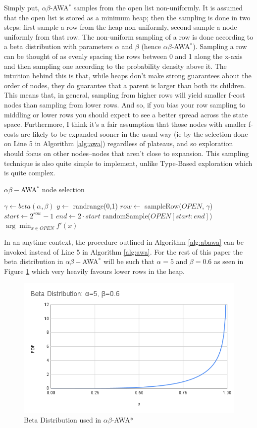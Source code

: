 Simply put, $\alpha \beta$-AWA$^*$ samples from the open list non-uniformly. It is assumed that the open list is stored as a minimum heap; then the sampling is done in two steps: first sample a row from the heap non-uniformly, second sample a node uniformly from that row. The non-uniform sampling of a row is done according to a beta distribution with parameters $\alpha$ and $\beta$ (hence $\alpha \beta$-AWA$^*$). Sampling a row can be thought of as evenly spacing the rows between 0 and 1 along the x-axis and then sampling one according to the probability density above it. The intuition behind this is that, while heaps don't make strong guarantees about the order of nodes, they do guarantee that a parent is larger than both its children. This means that, in general, sampling from higher rows will yield smaller f-cost nodes than sampling from lower rows. And so, if you bias your row sampling to middling or lower rows you should expect to see a better spread across the state space. Furthermore, I think it's a fair assumption that those nodes with smaller f-costs are likely to be expanded sooner in the usual way (ie by the selection done on Line 5 in Algorithm \ref{alg:awa}) regardless of plateaus, and so exploration should focus on other nodes--nodes that aren't close to expansion. This sampling technique is also quite simple to implement, unlike Type-Based exploration which is quite complex.

\begin{algorithm}
\caption{$\alpha \beta-$AWA$^*$ node selection}\label{alg:abawa}
\begin{algorithmic}
\Require $\gamma \gets beta(\alpha, \beta)$
\State $y \gets $ randrange(0,1)
    \State $row \gets $ sampleRow($OPEN$, $\gamma$)
    \State $start \gets 2^{row}-1$
    \State $end \gets 2 \cdot start$
    \State \Return randomSample($OPEN[start:end]$)
\Else{}
    \State \Return $\arg \min_{x \in OPEN} f'(x)$
\EndIf
\end{algorithmic}
\end{algorithm}

In an anytime context, the procedure outlined in Algorithm \ref{alg:abawa} can be invoked instead of Line 5 in Algorithm \ref{alg:awa}. For the rest of this paper the beta distribution in $\alpha \beta-$AWA$^*$ will be such that $\alpha=5$ and $\beta=0.6$ as seen in Figure \ref{fig:beta} which very heavily favours lower rows in the heap.

\noindent
\begin{figure}
    \begin{center}\includegraphics[scale=0.35]{media/beta.png}\end{center}
    \caption{Beta Distribution used in $\alpha\beta$-AWA*}\label{fig:beta}
\end{figure}